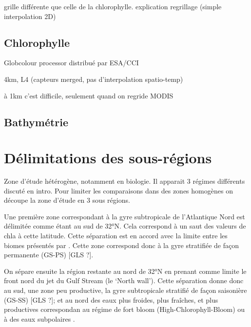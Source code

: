 \documentclass[index]{subfiles}
\begin{document}
grille différente que celle de la chlorophylle.
explication regrillage (simple interpolation 2D)

\subsection{Chlorophylle}
\label{sec:donnees-chl}

Globcolour processor
distribué par ESA/CCI

4km, L4 (capteurs merged, pas d'interpolation spatio-temp)

à 1km c'est difficile, seulement quand on regride MODIS

\subsection{Bathymétrie}
\label{sec:donnees-bathymetrie}


\section{Délimitations des sous-régions}
\label{sec:delimitations-regions}

Zone d'étude hétérogène, notamment en biologie.
Il apparait 3 régimes différents discuté en intro.
Pour limiter les comparaisons dans des zones homogènes on découpe la zone d'étude en 3 sous régions.

Une première zone correspondant à la gyre subtropicale de l'Atlantique Nord est délimitée comme étant au sud de 32°N.
Cela correspond à un saut des valeurs de \gls{chla} à cette latitude.
Cette séparation est en accord avec la limite entre les biomes présentés par \cite{sarmiento_2004}.
Cette zone correspond donc à la gyre stratifiée de façon permanente (GS-PS) [GLS ?].

On sépare ensuite la région restante au nord de 32°N en prenant comme limite le front nord du jet du Gulf Stream (le `North wall'). Cette séparation donne donc au sud, une zone peu productive, la gyre subtropicale stratifié de façon saisonière (GS-SS) [GLS ?]; et au nord des eaux plus froides, plus fraîches, et plus productives correspondan au régime de fort bloom (High-Chlorophyll-Bloom)  ou à des eaux subpolaires .
\end{document}
